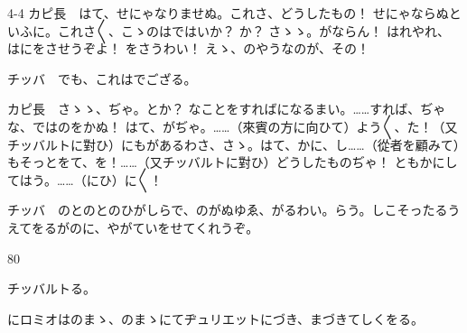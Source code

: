 \documentclass[tate,paper=b6j,jafontsize=9pt]{jlreq}
\begin{document}
\begin{azconvIndented}{4\zw}{-4\zw}
カピ長　はて、せにゃなりませぬ。これさ、どうしたもの！ せにゃならぬといふに。これさ{〳〵}、こゝのはではいか？ か？ さゝゝ。がならん！ はれやれ、はにをさせうぞよ！ をさうわい！ えゝ、のやうなのが、その！

チッバ　でも、これはでござる。

カピ長　さゝゝ、ぢゃ。とか？ なことをすればになるまい。……すれば、ぢゃな、ではのをかぬ！ はて、がぢゃ。……（來賓の方に向ひて）よう{〳〵}、た！（又チッバルトに對ひ）にもがあるわさ、さゝ。はて、かに、し……（從者を顧みて）もそっとをて、を！……（又チッバルトに對ひ）どうしたものぢゃ！ ともかにしてはう。……（にひ）に{〳〵}！

チッバ　のとのとのひがしらで、のがぬゆゑ、がるわい。らう。しこそったるうえてをるがのに、やがていをせてくれうぞ。

\end{azconvIndented}
\begin{azconvIndented}{8\zw}{0\zw}

チッバルトる。

にロミオはのまゝ、のまゝにてヂュリエットにづき、まづきてしくをる。

\end{azconvIndented}
\end{document}

